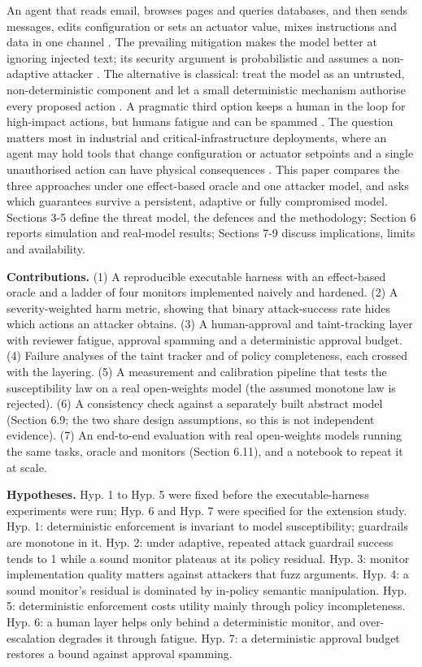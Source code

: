 \documentclass[11pt]{article}
\begin{document}
An agent that reads email, browses pages and queries databases, and then sends messages, edits configuration or sets an actuator value, mixes instructions and data in one channel \cite{greshake,zverev}. The prevailing mitigation makes the model better at ignoring injected text; its security argument is probabilistic and assumes a non-adaptive attacker \cite{nasr,zhan25}. The alternative is classical: treat the model as an untrusted, non-deterministic component and let a small deterministic mechanism authorise every proposed action \cite{anderson,saltzer}. A pragmatic third option keeps a human in the loop for high-impact actions, but humans fatigue and can be spammed \cite{alahmadi}. The question matters most in industrial and critical-infrastructure deployments, where an agent may hold tools that change configuration or actuator setpoints and a single unauthorised action can have physical consequences \cite{nist80082}. This paper compares the three approaches under one effect-based oracle and one attacker model, and asks which guarantees survive a persistent, adaptive or fully compromised model. Sections 3-5 define the threat model, the defences and the methodology; Section 6 reports simulation and real-model results; Sections 7-9 discuss implications, limits and availability.

\textbf{Contributions.} (1) A reproducible executable harness with an effect-based oracle and a ladder of four monitors implemented naively and hardened. (2) A severity-weighted harm metric, showing that binary attack-success rate hides which actions an attacker obtains. (3) A human-approval and taint-tracking layer with reviewer fatigue, approval spamming and a deterministic approval budget. (4) Failure analyses of the taint tracker and of policy completeness, each crossed with the layering. (5) A measurement and calibration pipeline that tests the susceptibility law on a real open-weights model (the assumed monotone law is rejected). (6) A consistency check against a separately built abstract model (Section 6.9; the two share design assumptions, so this is not independent evidence). (7) An end-to-end evaluation with real open-weights models running the same tasks, oracle and monitors (Section 6.11), and a notebook to repeat it at scale.

\textbf{Hypotheses.} Hyp. 1 to Hyp. 5 were fixed before the executable-harness experiments were run; Hyp. 6 and Hyp. 7 were specified for the extension study. Hyp. 1: deterministic enforcement is invariant to model susceptibility; guardrails are monotone in it. Hyp. 2: under adaptive, repeated attack guardrail success tends to 1 while a sound monitor plateaus at its policy residual. Hyp. 3: monitor implementation quality matters against attackers that fuzz arguments. Hyp. 4: a sound monitor's residual is dominated by in-policy semantic manipulation. Hyp. 5: deterministic enforcement costs utility mainly through policy incompleteness. Hyp. 6: a human layer helps only behind a deterministic monitor, and over-escalation degrades it through fatigue. Hyp. 7: a deterministic approval budget restores a bound against approval spamming.
\end{document}
